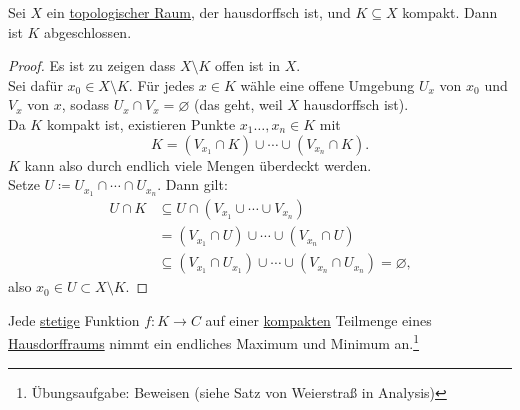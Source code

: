 \begin{lemma}
  Sei \( X \) ein \hyperref[def:topologie]{topologischer Raum}, der hausdorffsch ist, und \( K \subseteq X \) kompakt. Dann ist \( K \) abgeschlossen.
  \begin{proof}
    Es ist zu zeigen dass \( X \setminus K \) offen ist in \( X \). \\
    Sei dafür \( x_0 \in X \setminus K \). Für jedes \( x \in K \) wähle eine offene Umgebung \( U_x \) von \( x_0 \) und \( V_x \) von \( x \), sodass \( U_x \cap V_x = \varnothing \) (das geht, weil \( X \) hausdorffsch ist). \\
    Da \( K \) kompakt ist, existieren Punkte \( x_1 \dots, x_n \in K \) mit
    \begin{equation*}
      K = (V_{x_1} \cap K) \cup \cdots \cup (V_{x_n} \cap K)\text{.}
    \end{equation*}
    \( K \) kann also durch endlich viele Mengen überdeckt werden. \\
    Setze \( U \coloneqq U_{x_1} \cap \cdots \cap U_{x_n} \). Dann gilt:
    \begin{align*}
      U \cap K &\subseteq U \cap (V_{x_1} \cup \cdots \cup V_{x_n}) \\
       &= (V_{x_1} \cap U) \cup \cdots \cup (V_{x_n} \cap U) \\
       &\subseteq (V_{x_1} \cap U_{x_1}) \cup \cdots \cup (V_{x_n} \cap U_{x_n}) = \varnothing\text{,}
    \end{align*}
    also \( x_0 \in U \subset X \setminus K \).
  \end{proof}
\end{lemma}

\begin{corollary}
  Jede \hyperref[def:stetig]{stetige} Funktion \( f : K \to C \) auf einer \hyperref[def:kompakt]{kompakten} Teilmenge eines \hyperref[def:hausdorffsch]{Hausdorffraums} nimmt ein endliches Maximum und Minimum an.\footnote{Übungsaufgabe: Beweisen (siehe Satz von Weierstraß in Analysis)}
\end{corollary}

